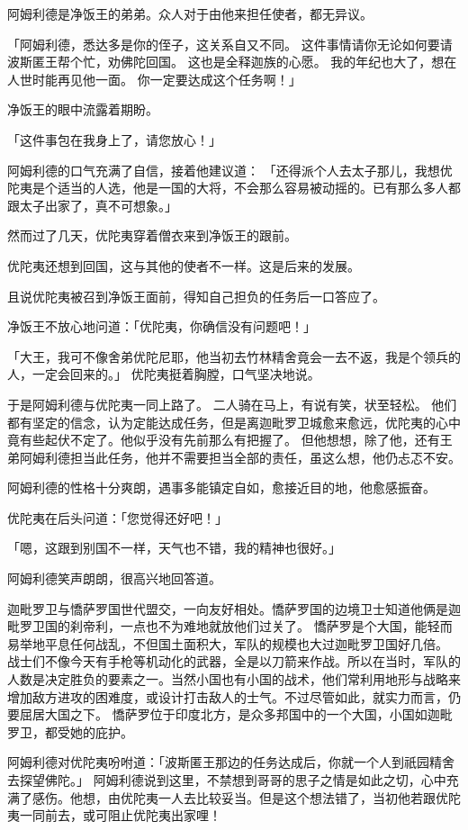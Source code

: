 \documentclass[twoside,openany]{book}
\begin{document}
阿姆利德是净饭王的弟弟。众人对于由他来担任使者，都无异议。

「阿姆利德，悉达多是你的侄子，这关系自又不同。
这件事情请你无论如何要请波斯匿王帮个忙，劝佛陀回国。
这也是全释迦族的心愿。
我的年纪也大了，想在人世时能再见他一面。
你一定要达成这个任务啊！」

净饭王的眼中流露着期盼。

「这件事包在我身上了，请您放心！」

阿姆利德的口气充满了自信，接着他建议道：
「还得派个人去太子那儿，我想优陀夷是个适当的人选，他是一国的大将，不会那么容易被动摇的。已有那么多人都跟太子出家了，真不可想象。」

然而过了几天，优陀夷穿着僧衣来到净饭王的跟前。

优陀夷还想到回国，这与其他的使者不一样。这是后来的发展。

且说优陀夷被召到净饭王面前，得知自己担负的任务后一口答应了。

净饭王不放心地问道：「优陀夷，你确信没有问题吧！」

「大王，我可不像舍弟优陀尼耶，他当初去竹林精舍竟会一去不返，我是个领兵的人，一定会回来的。」
优陀夷挺着胸膛，口气坚决地说。

于是阿姆利德与优陀夷一同上路了。
二人骑在马上，有说有笑，状至轻松。
他们都有坚定的信念，认为定能达成任务，但是离迦毗罗卫城愈来愈远，优陀夷的心中竟有些起伏不定了。他似乎没有先前那么有把握了。
但他想想，除了他，还有王弟阿姆利德担当此任务，他并不需要担当全部的责任，虽这么想，他仍忐忑不安。

阿姆利德的性格十分爽朗，遇事多能镇定自如，愈接近目的地，他愈感振奋。

优陀夷在后头问道：「您觉得还好吧！」

「嗯，这跟到别国不一样，天气也不错，我的精神也很好。」

阿姆利德笑声朗朗，很高兴地回答道。

迦毗罗卫与憍萨罗国世代盟交，一向友好相处。憍萨罗国的边境卫士知道他俩是迦毗罗卫国的刹帝利，一点也不为难地就放他们过关了。
憍萨罗是个大国，能轻而易举地平息任何战乱，不但国土面积大，军队的规模也大过迦毗罗卫国好几倍。
战士们不像今天有手枪等机动化的武器，全是以刀箭来作战。所以在当时，军队的人数是决定胜负的要素之一。当然小国也有小国的战术，他们常利用地形与战略来增加敌方进攻的困难度，或设计打击敌人的士气。不过尽管如此，就实力而言，仍要屈居大国之下。
憍萨罗位于印度北方，是众多邦国中的一个大国，小国如迦毗罗卫，都受她的庇护。

阿姆利德对优陀夷吩咐道：「波斯匿王那边的任务达成后，你就一个人到祇园精舍去探望佛陀。」
阿姆利德说到这里，不禁想到哥哥的思子之情是如此之切，心中充满了感伤。他想，由优陀夷一人去比较妥当。但是这个想法错了，当初他若跟优陀夷一同前去，或可阻止优陀夷出家哩！
\end{document}
